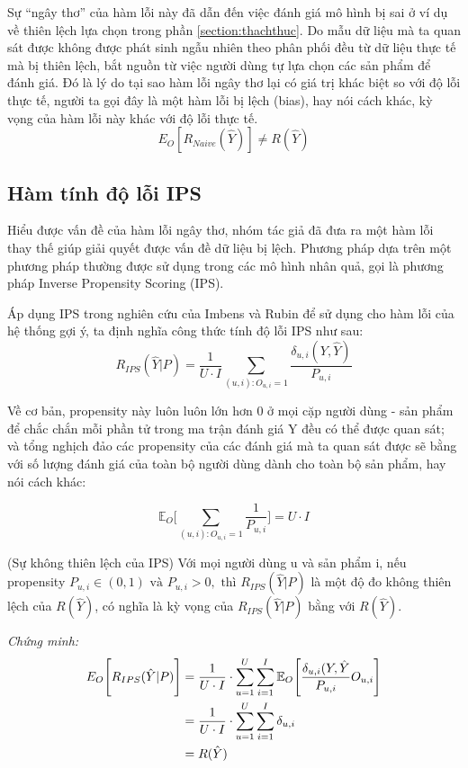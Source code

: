 Sự ``ngây thơ'' của hàm lỗi này đã dẫn đến việc đánh giá mô hình bị sai ở ví dụ về thiên lệch lựa chọn trong phần \ref{section:thachthuc}. Do mẫu dữ liệu mà ta quan sát được không được phát sinh ngẫu nhiên theo phân phối đều từ dữ liệu thực tế mà bị thiên lệch, bắt nguồn từ việc người dùng tự lựa chọn các sản phẩm để đánh giá. Đó là lý do tại sao hàm lỗi ngây thơ lại có giá trị khác biệt so với độ lỗi thực tế, người ta gọi đây là một hàm lỗi bị lệch (bias), hay nói cách khác, kỳ vọng của hàm lỗi này khác với độ lỗi thực tế.
\[E_O [R_{Naive} (\hat{Y})] \ne R(\hat{Y})\]

\subsection{Hàm tính độ lỗi IPS}
Hiểu được vấn đề của hàm lỗi ngây thơ, nhóm tác giả đã đưa ra một hàm lỗi thay thế giúp giải quyết được vấn đề dữ liệu bị lệch. Phương pháp dựa trên một phương pháp thường được sử dụng trong các mô hình nhân quả, gọi là phương pháp Inverse Propensity Scoring (IPS). 

Áp dụng IPS trong nghiên cứu của Imbens và Rubin \cite{imbens_rubin_2015} để sử dụng cho hàm lỗi của hệ thống gợi ý, ta định nghĩa công thức tính độ lỗi IPS như sau:
\begin{equation}
\label{eq:IPS}
R_{IPS}(\hat{Y}|P) = \frac{1}{U\cdot I}\sum_{(u,i):O_{u,i}=1} \frac{\delta_{u,i}(Y,\hat{Y})}{P_{u,i}}
\end{equation}

Về cơ bản, propensity này luôn luôn lớn hơn 0 ở mọi cặp người dùng - sản phẩm để chắc chắn mỗi phần tử trong ma trận đánh giá Y đều có thể được quan sát; và tổng nghịch đảo các propensity của các đánh giá mà ta quan sát được sẽ bằng với số lượng đánh giá của toàn bộ người dùng dành cho toàn bộ sản phẩm, hay nói cách khác:

\begin{equation}
\label{eq:EO}
\mathbb{E}_{O}\bigg[\sum_{(u,i):O_{u,i}=1} \frac{1}{P_{u,i}}\bigg] = U \cdot I
\end{equation}

\begin{lemma}
(Sự không thiên lệch của IPS)
Với mọi người dùng u và sản phẩm i, nếu propensity $P_{u,i} \in (0,1)\text{ và }  P_{u,i}>0, \text{ thì }  R_{IPS}(\hat{Y}|P)$ là một độ đo không thiên lệch của $R(\hat{Y})$, có nghĩa là kỳ vọng của $R_{IPS}(\hat{Y}|P)$ bằng với $R(\hat{Y})$.
\end{lemma}

\textit{Chứng minh:} 
\begin{equation}
\begin{aligned}
\mathcal\mathbb{E}_{O} \Bigg[R_{IPS}(\hat{Y}|P)\Bigg] &=  \frac{1}{U\cdot I} \cdot \sum_{u=1}^{U} \sum_{i=1}^{I} \mathbb{E}_{O} \Bigg[ \frac{\delta_{u,i}(Y,\hat{Y}}{P_{u,i}}{O_{u,i}}\Bigg] \\ &= \frac{1}{U\cdot I} \cdot \sum_{u=1}^{U} \sum_{i=1}^{I}\delta_{u,i} \\ &
= R(\hat{Y})
\end{aligned}
\end{equation}

